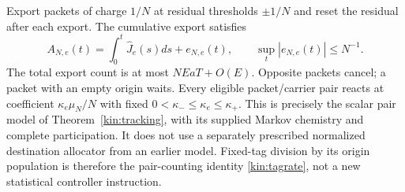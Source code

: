 \documentclass[11pt,oneside,openany]{book}
\theoremstyle{definition}
\theoremstyle{remark}\newtheorem{remark}[theorem]{Remark}
\begin{document}
Export packets of charge $1/N$ at residual thresholds $\pm1/N$ and
reset the residual after each export. The cumulative export satisfies
\begin{equation}
 A_{N,e}(t)=\int_0^t\widehat J_e(s)ds+e_{N,e}(t),
 \qquad\sup_t|e_{N,e}(t)|\le N^{-1}.            \label{copy:export}
\end{equation}
The total export count is at most $NEaT+O(E)$.
Opposite packets cancel; a packet with an empty origin waits. Every
eligible packet/carrier pair reacts at coefficient $\kappa_e\mu_N/N$
with fixed $0<\kappa_-\le\kappa_e\le\kappa_+$. This is precisely
the scalar pair model of Theorem~\ref{kin:tracking}, with its supplied
Markov chemistry and complete participation. It does not use a
separately prescribed normalized destination allocator from an earlier
model. Fixed-tag division by its origin population is therefore the
pair-counting identity \eqref{kin:tagrate}, not a new statistical
controller instruction.
\end{document}
